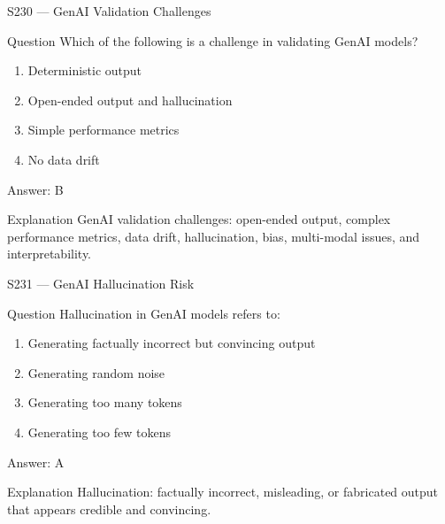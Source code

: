 \documentclass[aspectratio=169,8pt]{beamer}
\begin{document}
\begin{frame}{S230 --- GenAI Validation Challenges}
	\begin{block}{Question}
		Which of the following is a challenge in validating GenAI models?
		\begin{enumerate}
			\item Deterministic output
			\item Open-ended output and hallucination
			\item Simple performance metrics
			\item No data drift
		\end{enumerate}
	\end{block}
	\begin{exampleblock}{Answer: B}\end{exampleblock}
	\begin{block}{Explanation}
		GenAI validation challenges: open-ended output, complex performance metrics, data drift, hallucination, bias, multi-modal issues, and interpretability.
	\end{block}
\end{frame}

\begin{frame}{S231 --- GenAI Hallucination Risk}
	\begin{block}{Question}
		Hallucination in GenAI models refers to:
		\begin{enumerate}
			\item Generating factually incorrect but convincing output
			\item Generating random noise
			\item Generating too many tokens
			\item Generating too few tokens
		\end{enumerate}
	\end{block}
	\begin{exampleblock}{Answer: A}\end{exampleblock}
	\begin{block}{Explanation}
		Hallucination: factually incorrect, misleading, or fabricated output that appears credible and convincing.
	\end{block}
\end{frame}
\end{document}
